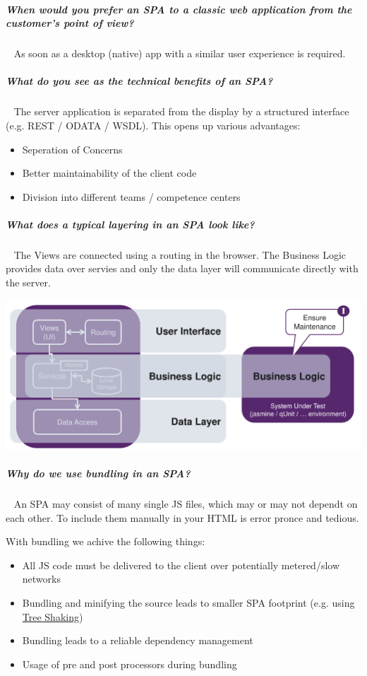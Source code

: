 \documentclass[10pt,twoside,landscape]{article}
\begin{document}
\begin{multicols}{4}
\subparagraph{When would you prefer an SPA to a classic web application from the customer's point of view?} \
\label{sec:org0945583}
As soon as a desktop (native) app with a similar user experience is required.
\subparagraph{What do you see as the technical benefits of an SPA?} \
\label{sec:org420985f}
The server application is separated from the display by a structured interface (e.g. REST / ODATA / WSDL). This opens up various advantages:
\begin{itemize}
\item Seperation of Concerns
\item Better maintainability of the client code
\item Division into different teams / competence centers
\end{itemize}
\subparagraph{What does a typical layering in an SPA look like?} \
\label{sec:org8009e4b}
The Views are connected using a routing in the browser.
The Business Logic provides data over servies and only the data layer will communicate directly with the server.

{
\begin{center}
\includegraphics[width=.9\linewidth]{img/spa_layering.png}
\end{center}
\label{fig:layering-in-spa}
}
\subparagraph{Why do we use bundling in an SPA?} \
\label{sec:orge416d5d}
An SPA may consist of many single JS files, which may or may not dependt on each other.
To include them manually in your HTML is error pronce and tedious.

With bundling we achive the following things:
\begin{itemize}
\item All JS code must be delivered to the client over potentially metered/slow networks
\item Bundling and minifying the source leads to smaller SPA footprint (e.g. using \href{../../../roam/20231228113108-what_is_tree_shaking.org}{Tree Shaking})
\item Bundling leads to a reliable dependency management
\item Usage of pre and post processors during bundling
\end{itemize}



\end{multicols}
\end{document}
